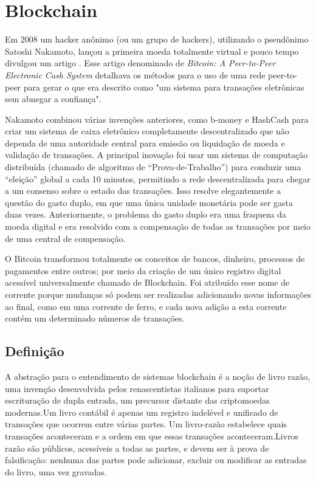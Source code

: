    
\section{Blockchain}

    
    Em 2008 um hacker anônimo (ou um grupo de hackers), utilizando o pseudônimo Satoshi Nakamoto, lançou a primeira moeda totalmente virtual e pouco tempo divulgou um artigo \cite{bitcoin_satoshi}. Esse artigo denominado de \textit{Bitcoin: A Peer-to-Peer Electronic Cash System} detalhava os métodos para o uso de uma rede peer-to-peer para gerar o que era descrito como "um sistema para transações eletrônicas sem abnegar a confiança".
    
    Nakamoto combinou várias invenções anteriores, como b-money e HashCash para criar um sistema de caixa eletrônico completamente descentralizado que não dependa de uma autoridade central para emissão ou liquidação de moeda e validação de transações. A principal inovação foi usar um sistema de computação distribuída (chamado de algoritmo de “Prova-de-Trabalho”) para conduzir uma “eleição” global a cada 10 minutos, permitindo a rede descentralizada para chegar a um consenso sobre o estado das transações. Isso resolve elegantemente a questão do gasto duplo, em que uma única unidade monetária pode ser gasta duas vezes. Anteriormente, o problema do gasto duplo era uma fraqueza da moeda digital e era resolvido com a compensação de todas as transações por meio de uma central de compensação.\cite{mastering_blockchain_andreas}
    
    O Bitcoin transformou totalmente os conceitos de bancos, dinheiro, processos de pagamentos entre outros; por meio da criação de um único registro digital acessível universalmente chamado de Blockchain. Foi atribuído esse nome de corrente porque mudanças só podem ser realizadas adicionando novas informações ao final, como em uma corrente de ferro, e cada nova adição a esta corrente contém um determinado números de transações.



    \subsection{Definição}
    
    A abstração para o entendimento de sistemas blockchain é a noção de livro razão, uma invenção desenvolvida pelos renascentistas italianos para suportar escrituração de dupla entrada, um precursor distante das criptomoedas modernas.Um livro contábil é apenas um registro indelével e unificado de transações que ocorrem entre várias partes. Um livro-razão estabelece quais transações aconteceram e a ordem em que essas transações aconteceram.Livros razão são públicos, acessíveis a todas as partes, e devem ser à prova de falsificação: nenhuma das partes pode adicionar, excluir ou modificar as entradas do livro, uma vez gravadas.\cite{blockchain_computing_perspective}
    
